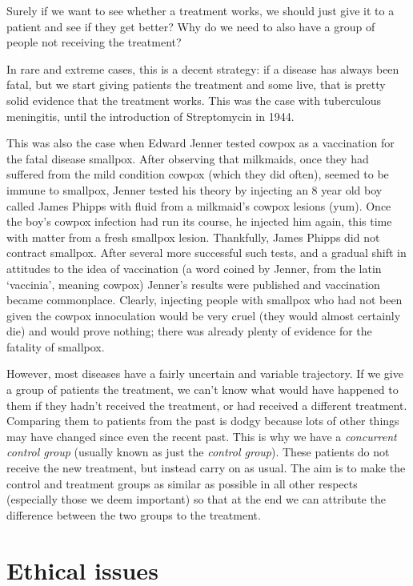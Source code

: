 \documentclass[
  openany]{book}
\theoremstyle{definition}
\theoremstyle{definition}
\theoremstyle{definition}
\theoremstyle{definition}
\theoremstyle{remark}
\begin{document}
Surely if we want to see whether a treatment works, we should just give it to a patient and see if they get better? Why do we need to also have a group of people not receiving the treatment?

In rare and extreme cases, this is a decent strategy: if a disease has always been fatal, but we start giving patients the treatment and some live, that is pretty solid evidence that the treatment works. This was the case with tuberculous meningitis, until the introduction of Streptomycin in 1944.

This was also the case when Edward Jenner tested cowpox as a vaccination for the fatal disease smallpox. After observing that milkmaids, once they had suffered from the mild condition cowpox (which they did often), seemed to be immune to smallpox, Jenner tested his theory by injecting an 8 year old boy called James Phipps with fluid from a milkmaid's cowpox lesions (yum). Once the boy's cowpox infection had run its course, he injected him again, this time with matter from a fresh smallpox lesion. Thankfully, James Phipps did not contract smallpox. After several more successful such tests, and a gradual shift in attitudes to the idea of vaccination (a word coined by Jenner, from the latin `vaccinia', meaning cowpox) Jenner's results were published and vaccination became commonplace. Clearly, injecting people with smallpox who had not been given the cowpox innoculation would be very cruel (they would almost certainly die) and would prove nothing; there was already plenty of evidence for the fatality of smallpox.

However, most diseases have a fairly uncertain and variable trajectory. If we give a group of patients the treatment, we can't know what would have happened to them if they hadn't received the treatment, or had received a different treatment. Comparing them to patients from the past is dodgy because lots of other things may have changed since even the recent past. This is why we have a \emph{concurrent control group} (usually known as just the \emph{control group}). These patients do not receive the new treatment, but instead carry on as usual. The aim is to make the control and treatment groups as similar as possible in all other respects (especially those we deem important) so that at the end we can attribute the difference between the two groups to the treatment.

\section{Ethical issues}\label{ethical-issues}
\end{document}
